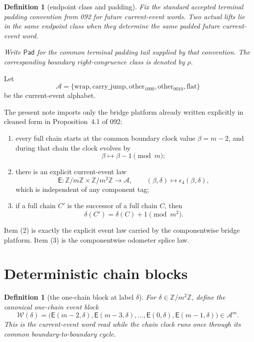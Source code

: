 \documentclass[11pt]{article}
\newtheorem{definition}[theorem]{Definition}
\newcommand{\Z}{\mathbb Z}
\newcommand{\Acal}{\mathcal A}
\newcommand{\Word}{\mathcal W}
\newcommand{\Pad}{\mathsf{Pad}}
\newcommand{\Ev}{\mathsf E}
\begin{document}
\begin{definition}[endpoint class and padding]
Fix the standard accepted terminal padding convention from 092 for future
current-event words. Two actual lifts lie in the same \emph{endpoint class}
when they determine the same padded future current-event word.

Write $\Pad$ for the common terminal padding tail supplied by that convention.
The corresponding boundary right-congruence class is denoted by $\rho$.
\end{definition}

Let
\[
\Acal=
\{\mathrm{wrap},\mathrm{carry\_jump},\mathrm{other}_{1000},
  \mathrm{other}_{0010},\mathrm{flat}\}
\]
be the current-event alphabet.

The present note imports only the bridge platform already written explicitly in
cleaned form in Proposition~4.1 of 092:
\begin{enumerate}[label=\textup{(\arabic*)},leftmargin=2.5em]
\item every full chain starts at the common boundary clock value
      $\beta=m-2$, and during that chain the clock evolves by
      \[
      \beta \mapsto \beta-1 \pmod m;
      \]
\item there is an explicit current-event law
      \[
      \Ev:\Z/m\Z \times \Z/m^2\Z \longrightarrow \Acal,
      \qquad
      (\beta,\delta) \longmapsto \epsilon_4(\beta,\delta),
      \]
      which is independent of any component tag;
\item if a full chain $C'$ is the successor of a full chain $C$, then
      \[
      \delta(C') = \delta(C)+1 \pmod{m^2}.
      \]
\end{enumerate}

Item \textup{(2)} is exactly the explicit event law carried by the componentwise
bridge platform. Item \textup{(3)} is the componentwise odometer splice law.

\section{Deterministic chain blocks}

\begin{definition}[the one-chain block at label $\delta$]
For $\delta\in\Z/m^2\Z$, define the canonical one-chain event block
\[
\Word(\delta)
=\bigl(\Ev(m-2,\delta),\Ev(m-3,\delta),\dots,\Ev(0,\delta),\Ev(m-1,\delta)\bigr)
\in \Acal^m.
\]
This is the current-event word read while the chain clock runs once through its
common boundary-to-boundary cycle.
\end{definition}
\end{document}

